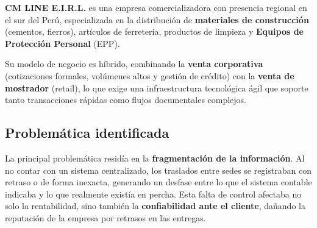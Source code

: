 \textbf{CM LINE E.I.R.L.} es una empresa comercializadora con presencia regional en el sur del Perú, especializada en la distribución de \textbf{materiales de construcción} (cementos, fierros), artículos de ferretería, productos de limpieza y \textbf{Equipos de Protección Personal} (EPP).

Su modelo de negocio es híbrido, combinando la \textbf{venta corporativa} (cotizaciones formales, volúmenes altos y gestión de crédito) con la \textbf{venta de mostrador} (retail), lo que exige una infraestructura tecnológica ágil que soporte tanto transacciones rápidas como flujos documentales complejos.

\subsection{Problemática identificada}
La principal problemática residía en la \textbf{fragmentación de la información}. Al no contar con un sistema centralizado, los traslados entre sedes se registraban con retraso o de forma inexacta, generando un desfase entre lo que el sistema contable indicaba y lo que realmente existía en percha. Esta falta de control afectaba no solo la rentabilidad, sino también la \textbf{confiabilidad ante el cliente}, dañando la reputación de la empresa por retrasos en las entregas.
